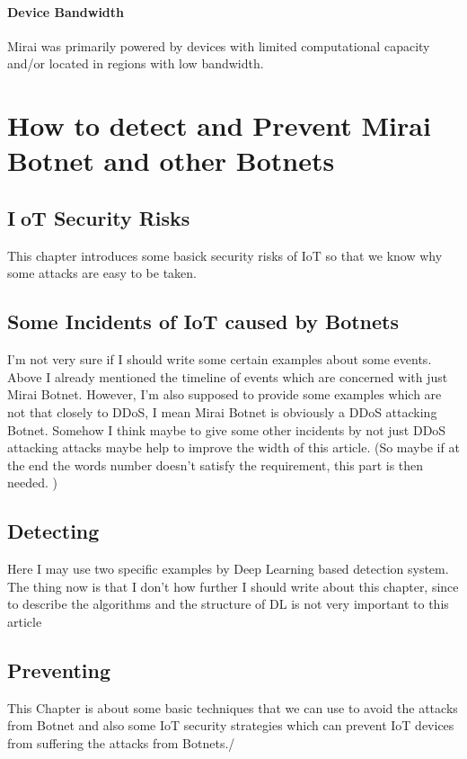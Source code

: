 \documentclass[conference]{IEEEtran}
\begin{document}
\paragraph{\textbf{Device Bandwidth}}
Mirai was primarily powered by devices with limited
computational capacity and/or located in regions with low
bandwidth.

\section{\textbf{How to detect and Prevent Mirai Botnet and other Botnets}}


\subsection{\textbf{IoT Security Risks}}
This chapter introduces some basick security risks of IoT so that we know why some attacks are easy to be taken.


\subsection{\textbf{Some Incidents of IoT caused by Botnets }}
I'm not very sure if I should write some certain examples about some events. Above I already mentioned the timeline of events which are concerned with just Mirai Botnet. However, I'm also supposed to provide some examples which are not 
that closely to DDoS, I mean Mirai Botnet is obviously a DDoS attacking Botnet. Somehow I think maybe to give some other incidents by not just DDoS attacking attacks maybe help to improve the width of this article.
(So maybe if at the end the words number doesn't satisfy the requirement, this part is then needed. )

\subsection{\textbf{Detecting}}
Here I may use two specific examples by Deep Learning based detection system.
The thing now is that I don't how further I should write about this chapter, since to describe the algorithms and the structure of DL is not very important to this article

\subsection{\textbf{Preventing}}
This Chapter is about some basic techniques that we can use to avoid the attacks from Botnet and also some IoT security strategies which can prevent IoT devices from suffering the attacks from Botnets./
\end{document}
